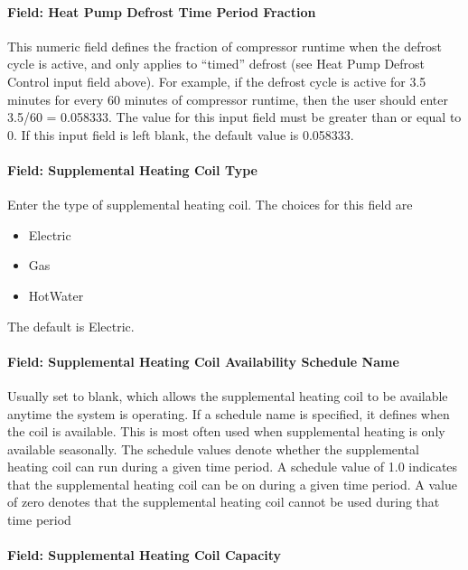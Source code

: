 \paragraph{Field: Heat Pump Defrost Time Period Fraction}\label{field-heat-pump-defrost-time-period-fraction}

This numeric field defines the fraction of compressor runtime when the defrost cycle is active, and only applies to ``timed'' defrost (see Heat Pump Defrost Control input field above). For example, if the defrost cycle is active for 3.5 minutes for every 60 minutes of compressor runtime, then the user should enter 3.5/60 = 0.058333. The value for this input field must be greater than or equal to 0. If this input field is left blank, the default value is 0.058333.

\paragraph{Field: Supplemental Heating Coil Type}\label{field-supplemental-heating-coil-type}

Enter the type of supplemental heating coil. The choices for this field are

\begin{itemize}
\item
  Electric
\item
  Gas
\item
  HotWater
\end{itemize}

The default is Electric.

\paragraph{Field: Supplemental Heating Coil Availability Schedule Name}\label{field-supplemental-heating-coil-availability-schedule-name}

Usually set to blank, which allows the supplemental heating coil to be available anytime the system is operating. If a schedule name is specified, it defines when the coil is available. This is most often used when supplemental heating is only available seasonally. The schedule values denote whether the supplemental heating coil can run during a given time period. A schedule value of 1.0 indicates that the supplemental heating coil can be on during a given time period. A value of zero denotes that the supplemental heating coil cannot be used during that time period

\paragraph{Field: Supplemental Heating Coil Capacity}\label{field-supplemental-heating-coil-capacity}

